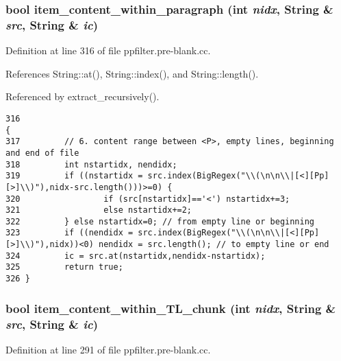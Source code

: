 \subsubsection{\setlength{\rightskip}{0pt plus 5cm}bool item\_\-content\_\-within\_\-paragraph (int {\em nidx}, {\bf String} \& {\em src}, {\bf String} \& {\em ic})}\label{ppfilter_8pre-blank_8cc_a10}




Definition at line 316 of file ppfilter.pre-blank.cc.

References String::at(), String::index(), and String::length().

Referenced by extract\_\-recursively().



\footnotesize\begin{verbatim}316                                                                         {
317         // 6. content range between <P>, empty lines, beginning and end of file
318         int nstartidx, nendidx;
319         if ((nstartidx = src.index(BigRegex("\\(\n\n\\|[<][Pp][>]\\)"),nidx-src.length()))>=0) {
320                 if (src[nstartidx]=='<') nstartidx+=3;
321                 else nstartidx+=2;
322         } else nstartidx=0; // from empty line or beginning
323         if ((nendidx = src.index(BigRegex("\\(\n\n\\|[<][Pp][>]\\)"),nidx))<0) nendidx = src.length(); // to empty line or end
324         ic = src.at(nstartidx,nendidx-nstartidx);
325         return true;
326 }
\end{verbatim}\normalsize 
{}
\subsubsection{\setlength{\rightskip}{0pt plus 5cm}bool item\_\-content\_\-within\_\-TL\_\-chunk (int {\em nidx}, {\bf String} \& {\em src}, {\bf String} \& {\em ic})}\label{ppfilter_8pre-blank_8cc_a8}




Definition at line 291 of file ppfilter.pre-blank.cc.

